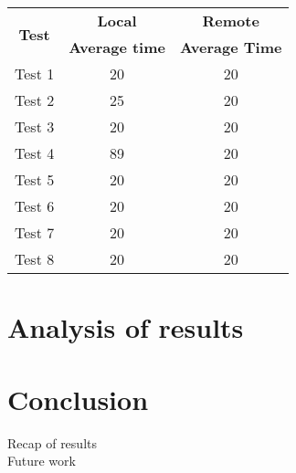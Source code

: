 \shorthandoff{-}
\begin{center}
    \begin{tabular}{| c | c | c |}
    \hline
    \multirow{2}{*}{\textbf{Test}} & \textbf{Local} & \textbf{Remote} \\ \cline{2-3}
    & \textbf{Average time} & \textbf{Average Time} \\ \hline
    Test 1 & 20 & 20 \\ \hline
    Test 2 & 25 & 20  \\ \hline
    Test 3 & 20 & 20 \\ \hline
    Test 4 & 89 & 20 \\ \hline
    Test 5 & 20 & 20 \\ \hline
    Test 6 & 20 & 20 \\ \hline
    Test 7 & 20 & 20 \\ \hline
    Test 8 & 20 & 20 \\ \hline
    \end{tabular}
\end{center}
\shorthandon{-}


\chapter{Analysis of results}
\label{results}

\chapter{Conclusion}
\label{conclusion}
Recap of results
\\
Future work


